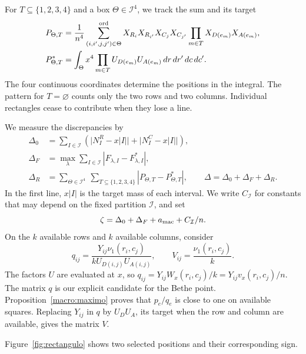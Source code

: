 \begin{definicion}\label{macro:rectangulos}
For $T\subseteq\{1,2,3,4\}$ and a box $\Theta\in\mathcal I^4$, we track the sum and its target
\begin{align*}
 P_{\Theta,T}&=\frac1{n^4}
 \sum_{(i,i',j,j')\in\Theta}^{\rm ord}
 X_{R_i}X_{R_{i'}}X_{C_j}X_{C_{j'}}
 \prod_{m\in T}X_{D(e_m)}X_{A(e_m)},\\
 P^*_{\Theta,T}&=\int_\Theta x^4\prod_{m\in T}U_{D(e_m)}U_{A(e_m)}
                  \,dr\,dr'\,dc\,dc'.
\end{align*}
The four continuous coordinates determine the positions in the integral. The pattern for
$T=\varnothing$ counts only the two rows and two columns. Individual rectangles cease to contribute
when they lose a line.
\end{definicion}

We measure the discrepancies by
\begin{align*}
 \Delta_0&=\sum_{I\in\mathcal I}
   (\bigl|N^R_I-x|I|\bigr|+\bigl|N^C_I-x|I|\bigr|),\\
 \Delta_F&=\max_{\lambda}\sum_{I\in\mathcal I}|F_{\lambda,I}-F^*_{\lambda,I}|,\\
 \Delta_R&=\sum_{\Theta\in\mathcal I^4}\ \sum_{T\subseteq\{1,2,3,4\}}
                      |P_{\Theta,T}-P^*_{\Theta,T}|,\qquad
 \Delta=\Delta_0+\Delta_F+\Delta_R .
\end{align*}
In the first line, $x|I|$ is the target mass of each interval. We write $C_{\mathcal I}$ for constants
that may depend on the fixed partition $\mathcal I$, and set
\[
 \zeta=\Delta_0+\Delta_F+a_{\rm mac}+C_{\mathcal I}/n .
\]
On the $k$ available rows and $k$ available columns, consider
\[
 q_{ij}=\frac{Y_{ij}\nu_1(r_i,c_j)}{kU_{D(i,j)}U_{A(i,j)}},\qquad
 V_{ij}=\frac{\nu_1(r_i,c_j)}k .
\]
The factors $U$ are evaluated at $x$, so $q_{ij}=Y_{ij}W_x(r_i,c_j)/k=Y_{ij}v_x(r_i,c_j)/n$.
The matrix $q$ is our explicit candidate for the Bethe point. Proposition~\ref{macro:maximo} proves
that $p_e/q_e$ is close to one on available squares. Replacing $Y_{ij}$ in $q$ by $U_DU_A$, its
target when the row and column are available, gives the matrix $V$.

Figure~\ref{fig:rectangulo} shows two selected positions and their corresponding sign.


